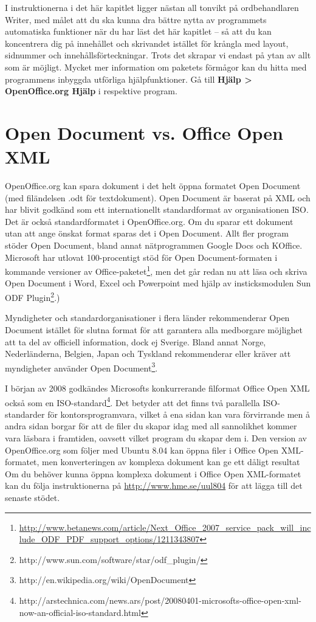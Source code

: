 \documentclass[a4paper,final]{memoir} %
\newcommand\xshortname{uul804}
\newcommand\xurl{http://www.hme.se/}
\newcommand\xubuntuver{8.04}
\begin{document}
I instruktionerna i det här kapitlet ligger nästan all tonvikt på ordbehandlaren Writer, med målet att du ska kunna dra bättre nytta av programmets automatiska funktioner när du har läst det här kapitlet -- så att du kan koncentrera dig på innehållet och skrivandet istället för krångla med layout, sidnummer och innehållsförteckningar. Trots det skrapar vi endast på ytan av allt som är möjligt. Mycket mer information om paketets förmågor kan du hitta med programmens inbyggda utförliga hjälpfunktioner. Gå till \textbf{Hjälp \textgreater{} OpenOffice.org Hjälp} i respektive program.

\section{Open Document  vs. Office Open XML}


OpenOffice.org kan spara dokument i det helt öppna formatet Open Document (med filändelsen .odt för textdokument). Open Document är baserat på XML och har blivit godkänd som ett internationellt standardformat av organisationen ISO. Det är också standardformatet i OpenOffice.org. Om du sparar ett dokument utan att ange önskat format sparas det i Open Document. Allt fler program stöder Open Document, bland annat nätprogrammen Google Docs och KOffice. Microsoft har utlovat 100-procentigt stöd för Open Document-formaten i kommande versioner av Office-paketet\footnote{\url{http://www.betanews.com/article/Next_Office_2007_service_pack_will_include_ODF_PDF_support_options/1211343807}}, men det går redan nu att läsa och skriva Open Document i Word, Excel och Powerpoint med hjälp av insticksmodulen Sun ODF Plugin\footnote{http://www.sun.com/software/star/odf\_plugin/}.)

Myndigheter och standardorganisationer i flera länder rekommenderar Open Document istället för slutna format för att garantera alla medborgare möjlighet att ta del av officiell information, dock ej Sverige. Bland annat Norge, Nederländerna, Belgien, Japan och Tyskland rekommenderar eller kräver att myndigheter använder Open Document\footnote{http://en.wikipedia.org/wiki/OpenDocument}.

I början av 2008 godkändes Microsofts konkurrerande filformat Office Open XML också som en ISO-standard\footnote{http://arstechnica.com/news.ars/post/20080401-microsofts-office-open-xml-now-an-official-iso-standard.html}. Det betyder att det finns två parallella ISO-standarder för kontorsprogramvara, vilket å ena sidan kan vara förvirrande men å andra sidan borgar för att de filer du skapar idag med all sannolikhet kommer vara läsbara i framtiden, oavsett vilket program du skapar dem i. Den version av OpenOffice.org som följer med Ubuntu \xubuntuver{} kan öppna filer i Office Open XML-formatet, men konverteringen av komplexa dokument kan ge ett dåligt resultat Om du behöver kunna öppna komplexa dokument i Office Open XML-formatet kan du följa instruktionerna på \url{\xurl\xshortname} för att lägga till det senaste stödet.
\end{document}
